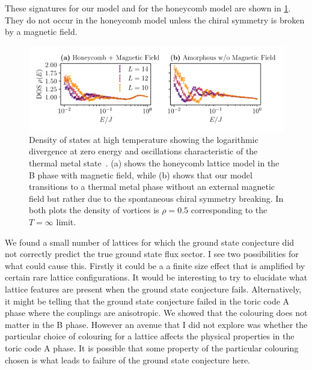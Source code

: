 These signatures for our model and for the honeycomb model are shown in \cref{fig:DOS_oscillations}. They do not occur in the honeycomb model unless the chiral symmetry is broken by a magnetic field.

\hypertarget{fig:DOS_oscillations}{%
\begin{figure}
\centering
\includegraphics[width=1\textwidth,height=\textheight]{figure_code/amk_chapter/results/DOS_oscillations/DOS_oscillations}
\caption[{Distinctive Oscillations in the Density of States}]{Density of states at high temperature showing the logarithmic divergence at zero energy and oscillations characteristic of the thermal metal state~\autocite{bocquet_disordered_2000,selfThermallyInducedMetallic2019}. (a) shows the honeycomb lattice model in the B phase with magnetic field, while (b) shows that our model transitions to a thermal metal phase without an external magnetic field but rather due to the spontaneous chiral symmetry breaking. In both plots the density of vortices is \(\rho = 0.5\) corresponding to the \(T = \infty\) limit.}
\label{fig:DOS_oscillations}
\end{figure}
}

We found a small number of lattices for which the ground state conjecture did not correctly predict the true ground state flux sector. I see two possibilities for what could cause this. Firstly it could be a a finite size effect that is amplified by certain rare lattice configurations. It would be interesting to try to elucidate what lattice features are present when the ground state conjecture fails. Alternatively, it might be telling that the ground state conjecture failed in the toric code A phase where the couplings are anisotropic. We showed that the colouring does not matter in the B phase. However an avenue that I did not explore was whether the particular choice of colouring for a lattice affects the physical properties in the toric code A phase. It is possible that some property of the particular colouring chosen is what leads to failure of the ground state conjecture here.

